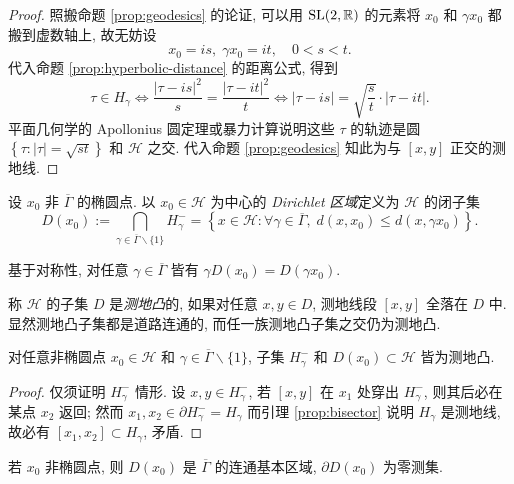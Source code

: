 \begin{proof}
	照搬命题 \ref{prop:geodesics} 的论证, 可以用 $\operatorname{SL}(2, \mathbb{R})$ 的元素将 $x_0$ 和 $\gamma x_0$ 都搬到虚数轴上, 故无妨设
	\[ x_0 = is, \; \gamma x_0 = it, \quad 0 < s < t. \]
	代入命题 \ref{prop:hyperbolic-distance} 的距离公式, 得到
	\[ \tau \in H_\gamma \iff \frac{|\tau - is|^2}{s} = \frac{|\tau - it|^2}{t} \iff |\tau - is| = \sqrt{\frac{s}{t}} \cdot |\tau - it|. \]
	平面几何学的 Apollonius 圆定理或暴力计算说明这些 $\tau$ 的轨迹是圆 $\left\{ \tau: |\tau| = \sqrt{st} \right\}$ 和 $\mathcal{H}$ 之交. 代入命题 \ref{prop:geodesics} 知此为与 $[x,y]$ 正交的测地线.
\end{proof}

\begin{definition}  
	设 $x_0$ 非 $\overline{\Gamma}$ 的椭圆点. 以 $x_0 \in \mathcal{H}$ 为中心的 \emph{Dirichlet 区域}定义为 $\mathcal{H}$ 的闭子集
	\[ D(x_0) := \bigcap_{\gamma \in \overline{\Gamma} \smallsetminus \{1\}} H_\gamma^- = \left\{ x \in \mathcal{H}: \forall \gamma \in \overline{\Gamma},\; d(x, x_0) \leq d(x, \gamma x_0) \right\}. \] 
\end{definition}
基于对称性, 对任意 $\gamma \in \overline{\Gamma}$ 皆有 $\gamma D(x_0) = D(\gamma x_0)$.

称 $\mathcal{H}$ 的子集 $D$ 是\emph{测地凸}的, 如果对任意 $x,y \in D$, 测地线段 $[x,y]$ 全落在 $D$ 中. 显然测地凸子集都是道路连通的, 而任一族测地凸子集之交仍为测地凸.
\begin{proposition}
	对任意非椭圆点 $x_0 \in \mathcal{H}$ 和 $\gamma \in \overline{\Gamma} \smallsetminus \{1\}$, 子集 $H_\gamma^-$ 和 $D(x_0) \subset \mathcal{H}$ 皆为测地凸.
\end{proposition}
\begin{proof}
	仅须证明 $H_\gamma^-$ 情形. 设 $x, y \in H_\gamma^-$, 若 $[x,y]$ 在 $x_1$ 处穿出 $H_\gamma^-$, 则其后必在某点 $x_2$ 返回; 然而 $x_1, x_2 \in \partial H_\gamma^- = H_\gamma$ 而引理 \ref{prop:bisector} 说明 $H_\gamma$ 是测地线, 故必有 $[x_1, x_2] \subset H_\gamma$, 矛盾.
\end{proof}

\begin{proposition}\label{prop:Dirichlet-domain} 
	若 $x_0$ 非椭圆点, 则 $D(x_0)$ 是 $\overline{\Gamma}$ 的连通基本区域, $\partial D(x_0)$ 为零测集.
\end{proposition}

